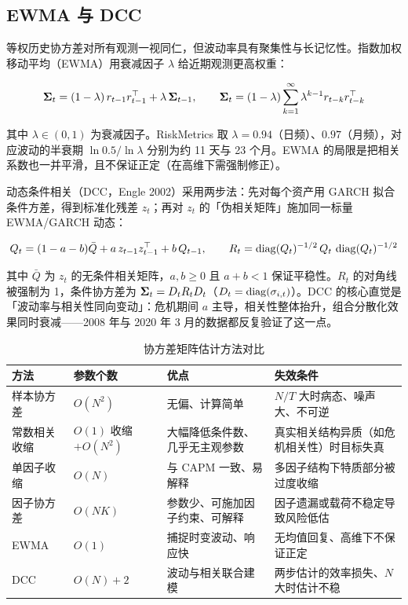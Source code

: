 \subsection{EWMA 与 DCC}

等权历史协方差对所有观测一视同仁，但波动率具有聚集性与长记忆性。指数加权移动平均（EWMA）用衰减因子 $\lambda$ 给近期观测更高权重：

\begin{equation}\label{eq:11-ewma}
  \bm{\Sigma}_t = (1-\lambda)\,r_{t-1}r_{t-1}^{\top} + \lambda\,\bm{\Sigma}_{t-1},
  \qquad
  \bm{\Sigma}_t = (1-\lambda)\sum_{k=1}^{\infty}\lambda^{k-1}r_{t-k}r_{t-k}^{\top}
\end{equation}

其中 $\lambda \in (0,1)$ 为衰减因子。RiskMetrics 取 $\lambda = 0.94$（日频）、$0.97$（月频），对应波动的半衰期 $\ln 0.5/\ln\lambda$ 分别为约 11 天与 23 个月。EWMA 的局限是把相关系数也一并平滑，且不保证正定（在高维下需强制修正）。

动态条件相关（DCC，Engle 2002）采用两步法：先对每个资产用 GARCH 拟合条件方差，得到标准化残差 $z_t$；再对 $z_t$ 的「伪相关矩阵」施加同一标量 EWMA/GARCH 动态：

\begin{equation}\label{eq:11-dcc}
  Q_t = (1-a-b)\bar{Q} + a\,z_{t-1}z_{t-1}^{\top} + b\,Q_{t-1},
  \qquad
  R_t = \operatorname{diag}(Q_t)^{-1/2}\,Q_t\,\operatorname{diag}(Q_t)^{-1/2}
\end{equation}

其中 $\bar{Q}$ 为 $z_t$ 的无条件相关矩阵，$a,b \ge 0$ 且 $a+b<1$ 保证平稳性。$R_t$ 的对角线被强制为 1，条件协方差为 $\bm{\Sigma}_t = D_t R_t D_t$（$D_t = \operatorname{diag}(\sigma_{i,t})$）。DCC 的核心直觉是「波动率与相关性同向变动」：危机期间 $a$ 主导，相关性整体抬升，组合分散化效果同时衰减——2008 年与 2020 年 3 月的数据都反复验证了这一点。

\begin{table}[htbp]
\centering
\caption{协方差矩阵估计方法对比}\label{tab:11-cov}
\tablefont
\begin{tabularx}{\textwidth}{@{}L{2.4cm}L{2.0cm}YL{3.2cm}@{}}
\toprule
方法 & 参数个数 & 优点 & 失效条件 \\
\midrule
样本协方差 & $O(N^{2})$ & 无偏、计算简单 & $N/T$ 大时病态、噪声大、不可逆 \\
常数相关收缩 & $O(1)$ 收缩 \newline $+O(N^{2})$ & 大幅降低条件数、几乎无主观参数 & 真实相关结构异质（如危机相关性）时目标失真 \\
单因子收缩 & $O(N)$ & 与 CAPM 一致、易解释 & 多因子结构下特质部分被过度收缩 \\
因子协方差 & $O(NK)$ & 参数少、可施加因子约束、可解释 & 因子遗漏或载荷不稳定导致风险低估 \\
EWMA & $O(1)$ & 捕捉时变波动、响应快 & 无均值回复、高维下不保证正定 \\
DCC & $O(N)+2$ & 波动与相关联合建模 & 两步估计的效率损失、$N$ 大时估计不稳 \\
\bottomrule
\end{tabularx}
\end{table}

